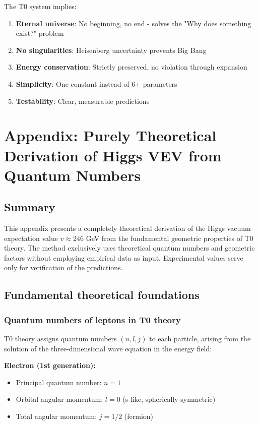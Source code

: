 \documentclass[12pt,a4paper]{article}
\begin{document}
The T0 system implies:
\begin{enumerate}
	\item \textbf{Eternal universe}: No beginning, no end - solves the "Why does something exist?" problem
	\item \textbf{No singularities}: Heisenberg uncertainty prevents Big Bang
	\item \textbf{Energy conservation}: Strictly preserved, no violation through expansion
	\item \textbf{Simplicity}: One constant instead of 6+ parameters
	\item \textbf{Testability}: Clear, measurable predictions
\end{enumerate}
\section{Appendix: Purely Theoretical Derivation of Higgs VEV from Quantum Numbers}

\subsection{Summary}

This appendix presents a completely theoretical derivation of the Higgs vacuum expectation value $v \approx 246$ GeV from the fundamental geometric properties of T0 theory. The method exclusively uses theoretical quantum numbers and geometric factors without employing empirical data as input. Experimental values serve only for verification of the predictions.

\subsection{Fundamental theoretical foundations}

\subsubsection{Quantum numbers of leptons in T0 theory}

T0 theory assigns quantum numbers $(n, l, j)$ to each particle, arising from the solution of the three-dimensional wave equation in the energy field:

\textbf{Electron (1st generation):}
\begin{itemize}
	\item Principal quantum number: $n = 1$
	\item Orbital angular momentum: $l = 0$ (s-like, spherically symmetric)
	\item Total angular momentum: $j = 1/2$ (fermion)
\end{itemize}
\end{document}
